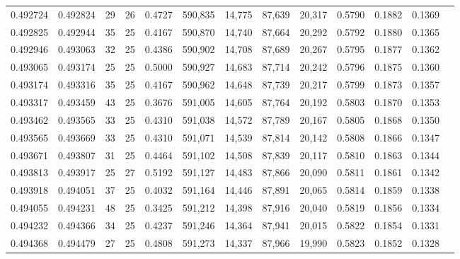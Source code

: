 \begin{tabular}{rrrrrrrrrrrrr}
0.492724 & 0.492824 &    29 &  26 &                                     0.4727 & 590,835 &  14,775 &  87,639 &  20,317 & 0.5790 & 0.1882 & 0.1369 \\
0.492825 & 0.492944 &    35 &  25 &                                     0.4167 & 590,870 &  14,740 &  87,664 &  20,292 & 0.5792 & 0.1880 & 0.1365 \\
0.492946 & 0.493063 &    32 &  25 &                                     0.4386 & 590,902 &  14,708 &  87,689 &  20,267 & 0.5795 & 0.1877 & 0.1362 \\
0.493065 & 0.493174 &    25 &  25 &                                     0.5000 & 590,927 &  14,683 &  87,714 &  20,242 & 0.5796 & 0.1875 & 0.1360 \\
0.493174 & 0.493316 &    35 &  25 &                                     0.4167 & 590,962 &  14,648 &  87,739 &  20,217 & 0.5799 & 0.1873 & 0.1357 \\
0.493317 & 0.493459 &    43 &  25 &                                     0.3676 & 591,005 &  14,605 &  87,764 &  20,192 & 0.5803 & 0.1870 & 0.1353 \\
0.493462 & 0.493565 &    33 &  25 &                                     0.4310 & 591,038 &  14,572 &  87,789 &  20,167 & 0.5805 & 0.1868 & 0.1350 \\
0.493565 & 0.493669 &    33 &  25 &                                     0.4310 & 591,071 &  14,539 &  87,814 &  20,142 & 0.5808 & 0.1866 & 0.1347 \\
0.493671 & 0.493807 &    31 &  25 &                                     0.4464 & 591,102 &  14,508 &  87,839 &  20,117 & 0.5810 & 0.1863 & 0.1344 \\
0.493813 & 0.493917 &    25 &  27 &                                     0.5192 & 591,127 &  14,483 &  87,866 &  20,090 & 0.5811 & 0.1861 & 0.1342 \\
0.493918 & 0.494051 &    37 &  25 &                                     0.4032 & 591,164 &  14,446 &  87,891 &  20,065 & 0.5814 & 0.1859 & 0.1338 \\
0.494055 & 0.494231 &    48 &  25 &                                     0.3425 & 591,212 &  14,398 &  87,916 &  20,040 & 0.5819 & 0.1856 & 0.1334 \\
0.494232 & 0.494366 &    34 &  25 &                                     0.4237 & 591,246 &  14,364 &  87,941 &  20,015 & 0.5822 & 0.1854 & 0.1331 \\
0.494368 & 0.494479 &    27 &  25 &                                     0.4808 & 591,273 &  14,337 &  87,966 &  19,990 & 0.5823 & 0.1852 & 0.1328 \\

\end{tabular}
